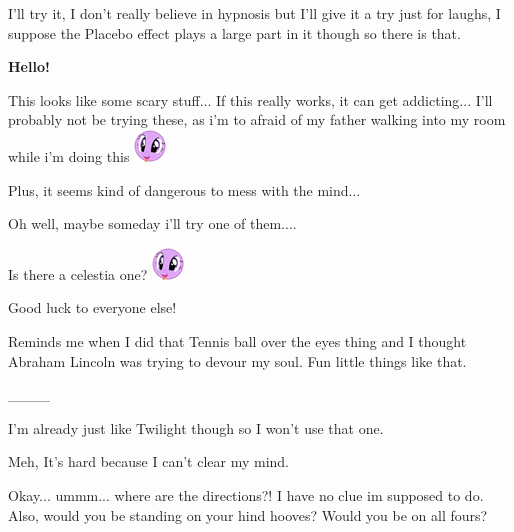 \documentclass[ebook,12pt,oneside,openany]{memoir}
\begin{document}
\begin{tcolorbox}[title=Harmonic Revelations,colback=brown!5!white,colframe=brown!75!black,coltitle=white]
\par{I'll try it, I don't really believe in hypnosis but I'll give it a try just for laughs, I suppose the Placebo effect plays a large part in it though so there is that.}
\newline{}
\newline{}
\begin{tcolorbox}[title=Concord]
\par{\textcolor[HTML]{0000ff}{\textbf{Hello!}}}
\newline{}
\par{This looks like some scary stuff... If this really works, it can get addicting... I'll probably not be trying these, as i'm to afraid of my father walking into my room while i'm doing this \includegraphics{images/mlp_eW9KEfP.png}}
\newline{}
\par{Plus, it seems kind of dangerous to mess with the mind...}
\newline{}
\par{Oh well, maybe someday i'll try one of them.... \begin{tiny}Is there a celestia one? \includegraphics{images/mlp_eW9KEfP.png}\end{tiny}}
\par{Good luck to everyone else!}
\end{tcolorbox}
\par{Reminds me when I did that Tennis ball over the eyes thing and I thought Abraham Lincoln was trying to devour my soul. Fun little things like that.}
\newline{}
\par{\_\_\_\_}
\newline{}
\par{I'm already just like Twilight though so I won't use that one.}
\newline{}
\par{Meh, It's hard because I can't clear my mind.}
\end{tcolorbox}
\begin{tcolorbox}[title=Delete this account,colback=purple!5!white,colframe=purple!75!black,coltitle=white]
\par{Okay... ummm... where are the directions?! I have no clue im supposed to do. Also, would you be standing on your hind hooves? Would you be on all fours?}
\end{tcolorbox}
\end{document}
